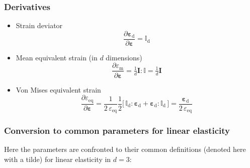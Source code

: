 \documentclass[times,namecite]{goose-article}
\begin{document}
\subsubsection{Derivatives}
\label{sec:nomenclature:derivatives}

\begin{itemize}
%
\item Strain deviator
\begin{equation}
  \frac{ \partial \bm{\varepsilon}_\mathrm{d} }{ \partial \bm{\varepsilon} }
  = \mathbb{I}_\mathrm{d}
\end{equation}
%
\item Mean equivalent strain (in $d$ dimensions)
\begin{equation}
  \frac{ \partial \varepsilon_\mathrm{m} }{ \partial \bm{\varepsilon} }
  =
  \tfrac{1}{d} \bm{I} : \mathbb{I}
  =
  \tfrac{1}{d} \bm{I}
\end{equation}
%
\item Von Mises equivalent strain
\begin{equation}
  \frac{ \partial \varepsilon_\mathrm{eq} }{ \partial \bm{\varepsilon} }
  =
  \frac{1}{2 \, \varepsilon_\mathrm{eq}} \frac{1}{2}
  \big[\, \mathbb{I}_\mathrm{d} : \bm{\varepsilon}_\mathrm{d} + \bm{\varepsilon}_\mathrm{d} : \mathbb{I}_\mathrm{d} \,\big]
  =
  \frac{\bm{\varepsilon}_\mathrm{d}}{2 \, \varepsilon_\mathrm{eq}}
\end{equation}
%
\end{itemize}

\subsubsection{Conversion to common parameters for linear elasticity}

Here the parameters are confronted to their common definitions (denoted here with a tilde) for linear elasticity in $d = 3$:
\end{document}

